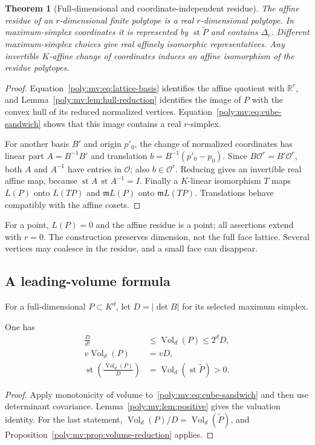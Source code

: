 \documentclass[11pt,a4paper]{article}
\numberwithin{equation}{section}
\newtheorem{theorem}{Theorem}[section]
\theoremstyle{plain}
\newcommand{\R}{\mathbb R}
\newcommand{\st}{\operatorname{st}}
\newcommand{\OO}{\mathcal O}
\newcommand{\mm}{\mathfrak m}
\newcommand{\Vol}{\operatorname{Vol}}
\begin{document}
\begin{theorem}[Full-dimensional and coordinate-independent residue]
\label{poly:mv:thm:affine-residue}
The affine residue of an $r$-dimensional finite polytope is a real
$r$-dimensional polytope. In maximum-simplex coordinates it is represented
by $\st\widetilde P$ and contains $\Delta_r$. Different maximum-simplex
choices give real affinely isomorphic representatives. Any invertible
$K$-affine change of coordinates induces an affine isomorphism of the
residue polytopes.
\end{theorem}
\begin{proof}
Equation~\eqref{poly:mv:eq:lattice-basis} identifies the affine quotient with
$\R^r$, and Lemma~\ref{poly:mv:lem:hull-reduction} identifies the image of $P$
with the convex hull of its reduced normalized vertices.
Equation~\eqref{poly:mv:eq:cube-sandwich} shows that this image contains a real
$r$-simplex.

For another basis $B'$ and origin $p'_0$, the change of normalized
coordinates has linear part $A=B^{-1}B'$ and translation
$b=B^{-1}(p'_0-p_0)$. Since $B\OO^r=B'\OO^r$, both $A$ and $A^{-1}$
have entries in $\OO$; also $b\in\OO^r$. Reducing gives an invertible
real affine map, because $\st A\,\st A^{-1}=I$. Finally a $K$-linear
isomorphism $T$ maps $L(P)$ onto $L(TP)$ and $\mm L(P)$ onto
$\mm L(TP)$. Translations behave compatibly with the affine cosets.
\end{proof}

For a point, $L(P)=0$ and the affine residue is a point; all assertions
extend with $r=0$. The construction preserves dimension, not the full
face lattice. Several vertices may coalesce in the residue, and a small
face can disappear.

\subsection{A leading-volume formula}
For a full-dimensional $P\subset K^d$, let $D=|\det B|$ for its selected
maximum simplex.

\begin{corollary}
\label{poly:mv:cor:leading-volume}
One has
\begin{align}
 \frac{D}{d!}&\le\Vol_d(P)\le2^dD,\label{poly:mv:eq:volume-squeeze}\\
 v\Vol_d(P)&=vD,\label{poly:mv:eq:volume-value}\\
 \st\left(\frac{\Vol_d(P)}{D}\right)
     &=\Vol_d(\st\widetilde P)>0.\label{poly:mv:eq:volume-leading}
\end{align}
\end{corollary}
\begin{proof}
Apply monotonicity of volume to~\eqref{poly:mv:eq:cube-sandwich} and then use
determinant covariance. Lemma~\ref{poly:mv:lem:positive} gives the valuation
identity. For the last statement,
$\Vol_d(P)/D=\Vol_d(\widetilde P)$, and
Proposition~\ref{poly:mv:prop:volume-reduction} applies.
\end{proof}
\end{document}
